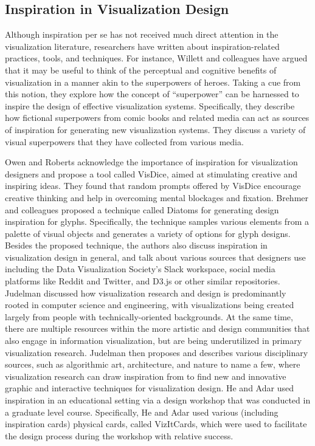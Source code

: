 \subsection{Inspiration in Visualization Design}
Although inspiration per se has not received much direct attention in the visualization literature, researchers have written about inspiration-related practices, tools, and techniques. For instance, Willett and colleagues \cite{willett_perception_2022} have argued that it may be useful to think of the perceptual and cognitive benefits of visualization in a manner akin to the superpowers of heroes. Taking a cue from this notion, they explore how the concept of ``superpower'' can be harnessed to inspire the design of effective visualization systems. Specifically, they describe how fictional superpowers from comic books and related media can act as sources of inspiration for generating new visualization systems. They discuss a variety of visual superpowers that they have collected from various media.

Owen and Roberts \cite{owen_inspire_2023} acknowledge the importance of inspiration for visualization designers and propose a tool called VisDice, aimed at stimulating creative and inspiring ideas. They found that random prompts offered by VisDice encourage creative thinking and help in overcoming mental blockages and fixation. Brehmer and colleagues \cite{brehmer_generative_2022} proposed a technique called Diatoms for generating design inspiration for glyphs. Specifically, the technique samples various elements from a palette of visual objects and generates a variety of options for glyph designs. Besides the proposed technique, the authors also discuss inspiration in visualization design in general, and talk about various sources that designers use including the Data Visualization Society's Slack workspace, social media platforms like Reddit and Twitter, and D3.js or other similar repositories. Judelman \cite{judelman_aesthetics_2004} discussed how visualization research and design is predominantly rooted in computer science and engineering, with visualizations being created largely from people with technically-oriented backgrounds. At the same time, there are multiple resources within the more artistic and design communities that also engage in information visualization, but are being underutilized in primary visualization research. Judelman then proposes and describes various disciplinary sources, such as algorithmic art, architecture, and nature to name a few, where visualization research can draw inspiration from to find new and innovative graphic and interactive techniques for visualization design. He and Adar \cite{he_vizitcards_2017} used inspiration in an educational setting via a design workshop that was conducted in a graduate level course. Specifically, He and Adar used various (including inspiration cards) physical cards, called VizItCards, which were used to facilitate the design process during the workshop with relative success.

